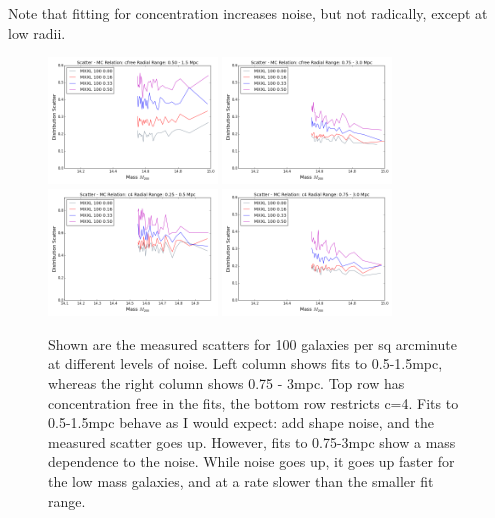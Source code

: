 \documentclass[11pt]{article}
\begin{document}
Note that fitting for concentration increases noise, but not radically, except at low radii.

\begin{figure}
\centering
\includegraphics[width=0.4\textwidth]{figures/noise_cfree-r5-n1_3_scatter}
\includegraphics[width=0.4\textwidth]{figures/noise_cfree-r10-n1_3_scatter}\\
\includegraphics[width=0.4\textwidth]{figures/noise_c4-r5-n1_3_scatter}
\includegraphics[width=0.4\textwidth]{figures/noise_c4-r10-n1_3_scatter}
\caption{Shown are the measured scatters for 100 galaxies per sq arcminute at different levels of noise. Left column shows fits to 0.5-1.5mpc, whereas the right column shows 0.75 - 3mpc. Top row has concentration free in the fits, the bottom row restricts c=4. Fits to 0.5-1.5mpc behave as I would expect: add shape noise, and the measured scatter goes up. However, fits to 0.75-3mpc show a mass dependence to the noise. While noise goes up, it goes up faster for the low mass galaxies, and at a rate slower than the smaller fit range.}
\label{fig:noisebias_highdensity_radrange}
\end{figure}
\end{document}
